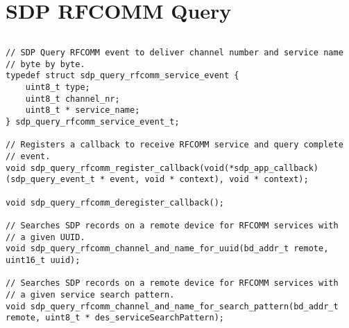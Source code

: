 \section{SDP RFCOMM Query}
\label{appendix:api_sdp_queries}
$ $
\begin{lstlisting}
// SDP Query RFCOMM event to deliver channel number and service name
// byte by byte.
typedef struct sdp_query_rfcomm_service_event {
    uint8_t type;
    uint8_t channel_nr;
    uint8_t * service_name;
} sdp_query_rfcomm_service_event_t;

// Registers a callback to receive RFCOMM service and query complete 
// event. 
void sdp_query_rfcomm_register_callback(void(*sdp_app_callback)(sdp_query_event_t * event, void * context), void * context);

void sdp_query_rfcomm_deregister_callback();

// Searches SDP records on a remote device for RFCOMM services with
// a given UUID.
void sdp_query_rfcomm_channel_and_name_for_uuid(bd_addr_t remote, uint16_t uuid);

// Searches SDP records on a remote device for RFCOMM services with
// a given service search pattern.
void sdp_query_rfcomm_channel_and_name_for_search_pattern(bd_addr_t remote, uint8_t * des_serviceSearchPattern);
\end{lstlisting}
\pagebreak
